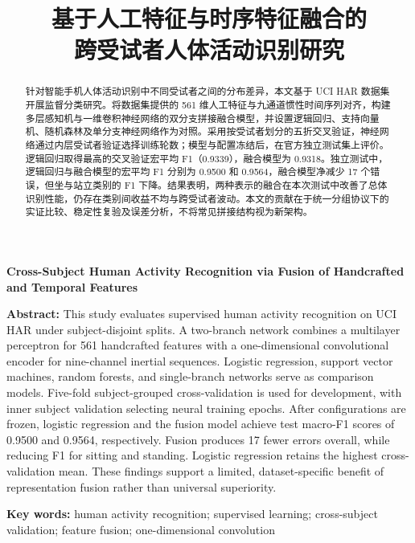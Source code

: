 \documentclass[lang=cn,11pt,a4paper,math=cm,bibstyle=gb7714-2015,citestyle=gb7714-2015]{elegantpaper}
\title{基于人工特征与时序特征融合的\\跨受试者人体活动识别研究}
\begin{document}
\maketitle
\begin{center}\small\bfseries Cross-Subject Human Activity Recognition via Fusion of Handcrafted and Temporal Features\end{center}
\begin{abstract}
针对智能手机人体活动识别中不同受试者之间的分布差异，本文基于 UCI HAR 数据集开展监督分类研究。将数据集提供的 561 维人工特征与九通道惯性时间序列对齐，构建多层感知机与一维卷积神经网络的双分支拼接融合模型，并设置逻辑回归、支持向量机、随机森林及单分支神经网络作为对照。采用按受试者划分的五折交叉验证，神经网络通过内层受试者验证选择训练轮数；模型与配置冻结后，在官方独立测试集上评价。逻辑回归取得最高的交叉验证宏平均 F1（0.9339），融合模型为 0.9318。独立测试中，逻辑回归与融合模型的宏平均 F1 分别为 0.9500 和 0.9564，融合模型净减少 17 个错误，但坐与站立类别的 F1 下降。结果表明，两种表示的融合在本次测试中改善了总体识别性能，仍存在类别间收益不均与跨受试者波动。本文的贡献在于统一分组协议下的实证比较、稳定性复验及误差分析，不将常见拼接结构视为新架构。
\end{abstract}
\noindent\textbf{Abstract:} This study evaluates supervised human activity recognition on UCI HAR under subject-disjoint splits. A two-branch network combines a multilayer perceptron for 561 handcrafted features with a one-dimensional convolutional encoder for nine-channel inertial sequences. Logistic regression, support vector machines, random forests, and single-branch networks serve as comparison models. Five-fold subject-grouped cross-validation is used for development, with inner subject validation selecting neural training epochs. After configurations are frozen, logistic regression and the fusion model achieve test macro-F1 scores of 0.9500 and 0.9564, respectively. Fusion produces 17 fewer errors overall, while reducing F1 for sitting and standing. Logistic regression retains the highest cross-validation mean. These findings support a limited, dataset-specific benefit of representation fusion rather than universal superiority.\par
\vspace{4pt}\noindent\textbf{Key words:} human activity recognition; supervised learning; cross-subject validation; feature fusion; one-dimensional convolution\par
\clearpage






\FloatBarrier
\printbibliography[heading=bibintoc,title={参考文献}]
\end{document}
